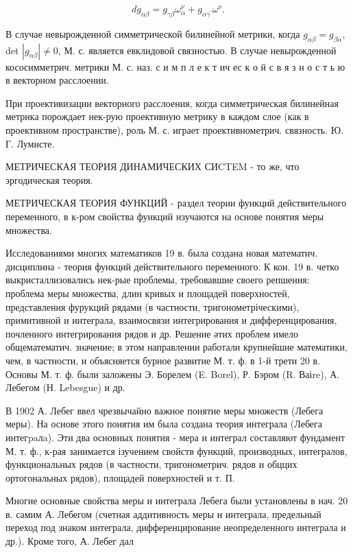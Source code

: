 \documentclass[10pt]{article}
\begin{document}
\[

d g_{\alpha \beta}=g_{\gamma \beta} \omega_{\alpha}^{\nu}+g_{\alpha \gamma^{\prime}} \omega^{\nu} .

\]



В случае невырожденной симметрической билинейной метрики, когда $g_{\alpha \beta}=g_{\beta \alpha}$, det $\left|g_{\alpha \beta}\right| \neq 0$, М. с. является евклидовой связностью. В случае невырожденной кососимметрич. метрики М. с. наз. с и м п л е к т ич ес к о й с в я з н о с т ь ю в векторном расслоении.



При проективизации векторного расслоения, когда симметрическая билинейная метрика порождает нек-рую проективную метрику в каждом слое (как в проективном пространстве), роль М. с. играет проективнометрич. связность. Ю. Г. Лумисте.



МЕТРИЧЕСКАЯ ТЕОРИЯ ДИНАМИЧЕСКИХ СИCTEM - то же, что эргодическая теория.



МЕТРИЧЕСКАЯ ТЕОРИЯ ФУНКЦИЙ - раздел теории функций действительного переменного, в к-ром свойства функций изучаются на основе понятия меры множества.



Исследованиями многих математиков 19 в. была создана новая математич. дисциплина - теория функций действительного переменного. К кон. 19 в. четко выкристаллизовались нек-рые проблемы, требовавшие своего репшения: проблема меры множества, длин кривых и площадей поверхностей, представления фурукций рядами (в частности, тригонометріческими), примитивной и интеграла, взаимосвязи интегрирования и дифференцирования, почленного интегрирования рядов и др. Решение әтих проблем имело общематематич. значение; в этом направлении работали крупнейшие математики, чем, в частности, и объясняется бурное развитие М. т. ф. в 1-й трети 20 в. Основы М. т. ф. были заложены Э. Борелем (E. Borel), Р. Бэром (R. Ваіre), А. Лебегом (Н. Lebesgue) и др.



В 1902 А. Лебег ввел чрезвычайно важное понятие меры множеств (Лебега меры). На основе этого понятия им была создана теория интеграла (Лебега интегpaлa). Эти два основных понятия - мера и интеграл составляют фундамент М. т. ф., к-рая занимается ізучением свойств функций, производных, интегралов, функциональных рядов (в частности, тригонометрич. рядов и обццих ортогональных рядов), площадей поверхностей и т. П.



Многие основные свойства меры и интеграла Лебега были установлены в нач. 20 в. самим А. Лебегом (счетная аддитивность меры и интеграла, предельный переход под знаком интеграла, дифференцирование неопределенного интеграла и др.). Кроме того, А. Лебег дал
\end{document}
